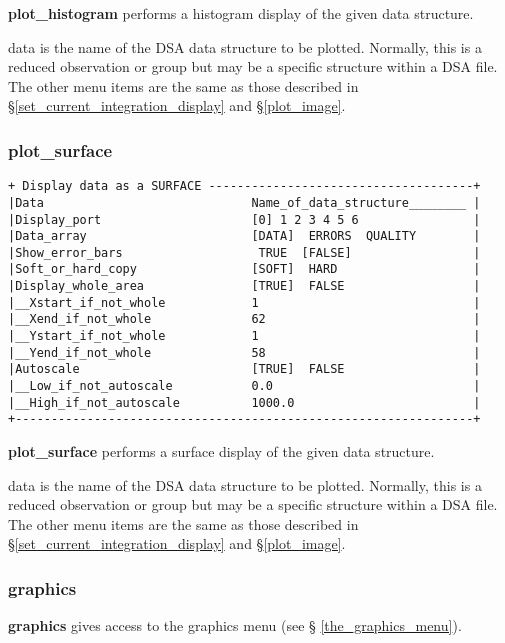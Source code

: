 {{\bf plot\_histogram} performs a histogram display of the given data 
structure. 

{\sf data} is the name of the DSA data structure to be plotted. Normally,
this is a reduced observation or group but may be a specific structure
within a DSA file. The other menu items are the same as those described
in \S \ref{set_current_integration_display} and \S \ref{plot_image}.

\subsubsection{plot\_surface}
\label{plot_surface}
\begin{verbatim}
+ Display data as a SURFACE -------------------------------------+
|Data                             Name_of_data_structure________ |
|Display_port                     [0] 1 2 3 4 5 6                |
|Data_array                       [DATA]  ERRORS  QUALITY        |
|Show_error_bars                   TRUE  [FALSE]                 |
|Soft_or_hard_copy                [SOFT]  HARD                   |
|Display_whole_area               [TRUE]  FALSE                  |
|__Xstart_if_not_whole            1                              |
|__Xend_if_not_whole              62                             |
|__Ystart_if_not_whole            1                              |
|__Yend_if_not_whole              58                             |
|Autoscale                        [TRUE]  FALSE                  |
|__Low_if_not_autoscale           0.0                            |
|__High_if_not_autoscale          1000.0                         |
+----------------------------------------------------------------+
\end{verbatim}

{\bf plot\_surface} performs a surface display of the given data structure.

{\sf data} is the name of the DSA data structure to be plotted. Normally,
this is a reduced observation or group but may be a specific structure
within a DSA file. The other menu items are the same as those described
in \S \ref{set_current_integration_display} and \S \ref{plot_image}.

\subsubsection{graphics}
\label{graphics}

{\bf graphics} gives access to the {\sf graphics} menu (see \S 
\ref{the_graphics_menu}).

}
